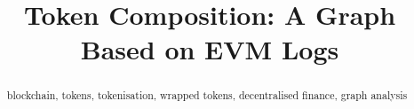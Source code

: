\documentclass[conference]{IEEEtran}
\begin{document}
\title{Token Composition: A Graph Based on EVM Logs}


\maketitle

\begin{abstract}
  
  \begin{IEEEkeywords}
    blockchain, tokens, tokenisation, wrapped tokens, decentralised
    finance, graph analysis
  \end{IEEEkeywords}
\end{abstract}













\end{document}
